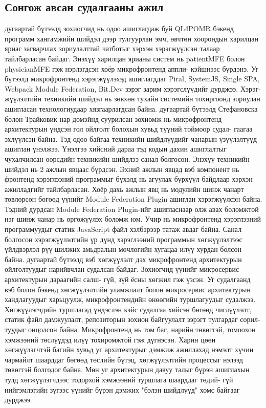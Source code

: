 \subsection{Сонгож авсан судалгааны ажил}
\hspace*{1cm}\cite{mohammed2022} дугаартай бүтээлд зохиогчид нь одоо ашиглагдаж буй QL4POMR бэкенд программ хангамжийн шийдэл дээр тулгуурлан эмч, өвчтөн хоорондын харилцан яриаг загварчлах зориулалттай чатботыг хэрхэн хэрэгжүүлсэн талаар тайлбарласан байдаг. Энэхүү харилцан ярианы систем нь patientMFE болон physicianMFE гэж нэрлэгдсэн хоёр микрофронтенд аппли- кэйшнээс бүрдэнэ. Уг бүтээлд микрофронтенд хэрэгжүүлэхэд ашиглагддаг Piral, SystemJS, Single SPA, Webpack Module Federation, Bit.Dev зэрэг зарим хэрэгслүүдийг дурджээ. Хэрэг- жүүлэлтийн техникийн шийдэл нь зөвхөн тухайн системийн тохиргоонд зориулан ашигласан технологиудаар хязгаарлагдсан байна.
\newline
\hspace*{1cm}\cite{stefanovska2022} дугаартай бүтээлд Стефановска болон Трайковик нар домэйнд суурилсан зохиомж нь микрофронтенд архитектурын үндсэн гол ойлголт болохын хувьд түүний тоймоор судал- гаагаа эхлүүлсэн байна. Тэд одоо байгаа техникийн шийдлүүдийг чанарын үзүүлэлтүүд ашиглан үнэлжээ. Үнэлгээ хийсний дараа тэд кодын дахин ашиглалтыг чухалчилсан өөрсдийн техникийн шийдлээ санал болгосон. Энэхүү техникийн шийдэл нь 2 ажлын явцаас бүрдсэн. Эхний ажлын явцад вэб компонент нь фронтенд хэрэглээний программыг бүхэлд нь агуулах бүрхүүл байдлаар хэрхэн ажилладгийг тайлбарласан. Хоёр дахь ажлын явц нь модулийн шинж чанарт төвлөрсөн бөгөөд үүнийг Module Federation Plugin ашиглан хэрэгжүүлсэн байна. Тэдний дурдсан Module Federation Plugin-ийг ашигласнаар олж авах боломжтой нэг шинж чанар нь өргөжүүлэх боломж юм. Учир нь микрофронтенд хэрэглээний программуудыг статик JavaScript файл хэлбэрээр татаж авдаг байна. Санал болгосон хэрэгжүүлэлтийн үр дүнд хэрэглээний программын хөгжүүлэлтээс үйлдвэрлэл рүү шилжих амьдралын мөчлөгийн хугацаа илүү хурдан болсон байна.
\newline
\hspace*{1cm}\cite{pavlenko2020} дугаартай бүтээлд вэб хөгжүүлэлт дэх микрофронтенд архитектурын ойлголтуудыг нарийвчлан судалсан байдаг. Зохиогчид үүнийг микросервис архитектурын дараагийн салш- гүй, зүй ёсны хөгжил гэж үзсэн. Уг судалгаанд вэб болон бэкенд хөгжүүлэлтийн уламжлалт болон микросервис архитектурын хандлагуудыг харьцуулж, микрофронтендийн өнөөгийн туршлагуудыг судалжээ. Хөгжүүлэгчдийн туршлагад үндэслэн кэйс судалгаа хийсэн бөгөөд чиглүүлэлт, статик файл дамжуулалт, репозиторын зохион байгуулалт зэрэгт тулгардаг сорил- туудыг онцолсон байна. Микрофронтенд нь том баг, нарийн төвөгтэй, томоохон хэмжээний төслүүдэд илүү тохиромжтой гэж дүгнэсэн. Харин цөөн хөгжүүлэгчтэй багийн хувьд уг архитектурыг дэмжиж ажиллахад нэмэлт хүчин чармайлт шаарддаг бөгөөд төслийн бүтэц, хөгжүүлэлтийн процессыг нэлээд төвөгтэй болгодог байна. Мөн уг архитектурын давуу талыг бүрэн ашиглахын тулд хөгжүүлэгчдээс тодорхой хэмжээний туршлага шаарддаг төдий- гүй нийгэмлэгийн зүгээс үүнийг бүрэн дэмжих "бэлэн шийдлүүд" хомс байгааг дурджээ.
